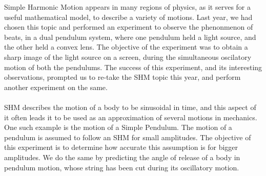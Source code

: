 Simple Harmonic Motion appears in many regions of physics, as it serves for a useful mathematical model, to describe a variety of motions. Last year, we had chosen this topic and performed an experiment to observe the phenonmenon of beats, in a dual pendulum system, where one pendulum held a light source, and the other held a convex lens. The objective of the experiment was to obtain a sharp image of the light source on a screen, during the simultaneous oscilatory motion of both the pendulums. The success of this experiment, and its interesting observations, prompted us to re-take the SHM topic this year, and perform another experiment on the same.\\ \\
SHM describes the motion of a body to be sinusoidal in time, and this aspect of it often leads it to be used as an approximation of several motions in mechanics. One such example is the motion of a Simple Pendulum. The motion of a pendulum is assumed to follow an SHM for small amplitudes. The objective of this experiment is to determine how accurate this assumption is for bigger amplitudes. We do the same by predicting the angle of release of a body in pendulum motion, whose string has been cut during its oscillatory motion.

